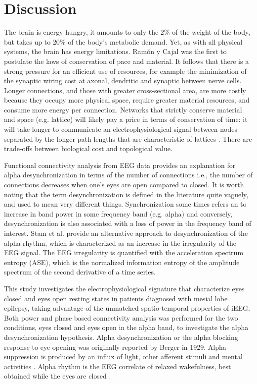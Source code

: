 \documentclass[11pt, onecolumn]{article}
\begin{document}
 
\section{Discussion}
The  brain  is energy  hungry,  it  amounts  to  only the  $2\%$ of the  weight  of the  body,  but  takes  up  to  $20\%$ of the  body's  metabolic demand. Yet, as with all physical systems, the brain has energy limitations. Ram{\'o}n y Cajal was the first to postulate the laws of conservation of pace and material. 
It follows that there is a strong pressure for an efficient use of resources, for example the minimization of the synaptic wiring cost at axonal, dendritic and synaptic between nerve cells.
Longer connections, and those with greater cross-sectional area, are more costly because they occupy more physical space, require greater material resources, and consume more energy per connection. Networks that strictly conserve material and space (e.g. lattice) will likely pay a price in terms of conservation of time: it will take longer to communicate an electrophysiological signal between nodes separated by the longer path lengths that are characteristic of lattices \citep{fornito2016fundamentals}. There are trade-offs between biological cost and topological value.

Functional connectivity analysis from EEG data provides an explanation for alpha desynchronization in terms of the number of connections i.e., the number of connections decreases when one's eyes are open compared to closed. It is worth noting that the term desynchronization is defined in the literature quite vaguely, and used to mean very different things. Synchronization some times refers an to increase in band power in some frequency band (e.g. alpha) and conversely, desynchronization is also associated with a loss of power in the frequency band of interest. 
Stam et al.\citep{stam1993quantification} provide an alternative approach to desynchronization of the alpha rhythm, which is characterized as an increase in the irregularity of the EEG signal. The EEG irregularity is quantified with the acceleration spectrum entropy (ASE), which is the normalized information entropy of the amplitude spectrum of the second derivative of a time series.

This study investigates the electrophysiological signature that characterize eyes closed and eyes open resting states in patients  diagnosed with mesial lobe epilepsy, taking advantage of the unmatched spatio-temporal properties of iEEG. Both power and phase based connectivity analysis was performed for the two conditions, eyes closed and eyes open in the alpha band, to investigate the alpha desynchronization hypothesis.
Alpha desynchronization or the alpha blocking response to eye opening was originally reported by Berger in 1929. Alpha suppression is produced by an influx of light, other afferent stimuli and mental activities \citep{schomer2012niedermeyer}. Alpha rhythm is the EEG correlate of relaxed wakefulness, best obtained while the eyes are closed  \citep{niedermeyer2005electroencephalography}. 
 
\end{document}
